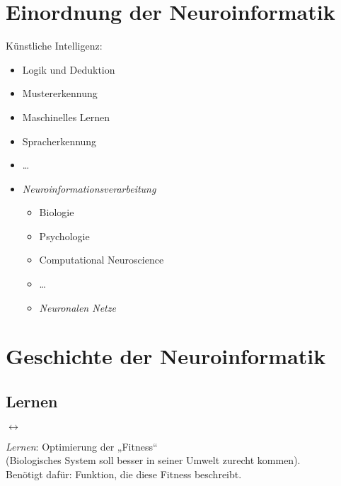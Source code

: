 \section{Einordnung der Neuroinformatik}
Künstliche Intelligenz:
\begin{itemize}
\item Logik und Deduktion
\item Mustererkennung
\item Maschinelles Lernen
\item Spracherkennung
\item …
\item \emph{Neuroinformationsverarbeitung}
\begin{itemize}
\item Biologie
\item Psychologie
\item Computational Neuroscience
\item …
\item \emph{Neuronalen Netze}
\end{itemize}
\end{itemize}

\section{Geschichte der Neuroinformatik}
\subsection{Lernen}
\begin{center}
 $\longleftrightarrow$ 
\end{center}
\emph{Lernen}: Optimierung der „Fitness“\\
(Biologisches System soll besser in seiner Umwelt zurecht kommen).\\
Benötigt dafür: Funktion, die diese Fitness beschreibt.

